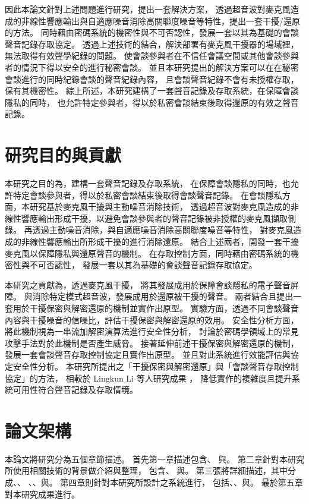     因此本論文針對上述問題進行研究，提出一套解決方案，
透過超音波對麥克風造成的非線性響應輸出與自適應噪音消除高關聯度噪音等特性，提出一套干擾/還原的方法。
同時藉由密碼系統的機密性與不可否認性，發展一套以其為基礎的會談聲音記錄存取協定。
透過上述技術的結合，解決部署有麥克風干擾器的場域裡，無法取得有效聲學紀錄的問題。
使會談參與者在不信任會議空間或其他會談參與者的情況下得以安全的進行秘密會談。
並且本研究提出的解決方案可以在在秘密會談進行的同時紀錄會談的聲音紀錄內容，
且會談聲音紀錄不會有未授權存取，保有其機密性。
綜上所述，本研究建構了一套聲音記錄及存取系統，在保障會談隱私的同時，
也允許特定參與者，得以於私密會談結束後取得還原的有效之聲音記錄。


\section{研究目的與貢獻}\label{section:intro-purpose}

    本研究之目的為，建構一套聲音記錄及存取系統，
在保障會談隱私的同時，也允許特定會談參與者，得以於私密會談結束後取得會談聲音記錄。
在會談隱私方面，本研究基於麥克風干擾與主動噪音消除技術，
透過超音波對麥克風造成的非線性響應輸出形成干擾，以避免會談參與者的聲音記錄被非授權的麥克風擷取側錄。
再透過主動噪音消除，與自適應噪音消除高關聯度噪音等特性，
對麥克風造成的非線性響應輸出所形成干擾的進行消除還原。
結合上述兩者，開發一套干擾麥克風以保障隱私與還原聲音的機制。
在存取控制方面，同時藉由密碼系統的機密性與不可否認性，
發展一套以其為基礎的會談聲音記錄存取協定。

    本研究之貢獻為，透過麥克風干擾\cite{chen2020wearable}\cite{roy2017backdoor}，
將其發展成用於保障會談隱私的電子聲音屏障。
與消除特定模式超音波\cite{he2019canceling}，發展成用於還原被干擾的聲音。
兩者結合且提出一套用於干擾保密與解密還原的機制並實作出原型。
實驗方面，透過不同會談聲音內容與干擾噪音的信噪比，評估干擾保密與解密還原的效用。
安全性分析方面，將此機制視為一串流加解密演算法進行安全性分析，
討論於密碼學領域上的常見攻擊手法對於此機制是否產生威脅。
接著延伸前述干擾保密與解密還原的機制，發展一套會談聲音存取控制協定且實作出原型。
並且對此系統進行效能評估與協定安全性分析。
本研究所提出之「干擾保密與解密還原」與「會談聲音存取控制協定」的方法，
相較於 Lingkun Li 等人研究成果 \cite{li2020patronus}，
降低實作的複雜度且提升系統可用性符合聲音記錄及存取情境。


\section{論文架構}\label{section:intro-arch}

    本論文將研究分為五個章節描述。
首先第一章描述包含、
與。
第二章針對本研究所使用相關技術的背景做介紹與整理，
包含、
與。
第三張將詳細描述，其中分成、、
、、與。
第四章則針對本研究所設計之系統進行，
包括、、與。
最於第五章對本研究成果進行。